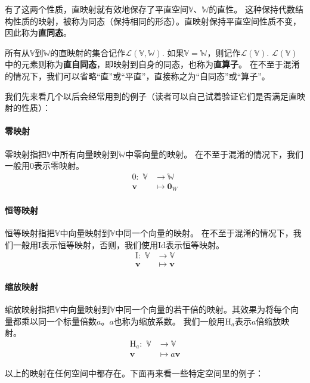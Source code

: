 \documentclass[12pt,UTF8]{ctexbook}
\begin{document}
有了这两个性质，直映射就有效地保存了平直空间$\mathbb{V}$、$\mathbb{W}$的直性。
这种保持代数结构性质的映射，被称为同态（保持相同的形态）。直映射保持平直空间性质不变，因此称为\textbf{直同态}。

所有从$\mathbb{V}$到$\mathbb{W}$的直映射的集合记作$\mathcal{L}(\mathbb{V},\mathbb{W})$.
如果$\mathbb{V} = \mathbb{W}$，则记作$\mathcal{L}(\mathbb{V})$.  
$\mathcal{L}(\mathbb{V})$中的元素则称为\textbf{直自同态}，即映射到自身的同态，也称为\textbf{直算子}。
在不至于混淆的情况下，我们可以省略“直”或“平直”，直接称之为“自同态”或“算子”。

我们先来看几个以后会经常用到的例子（读者可以自己试着验证它们是否满足直映射的性质）：

\paragraph{零映射} 零映射指把$\mathbb{V}$中所有向量映射到$\mathbb{W}$中零向量的映射。
在不至于混淆的情况下，我们一般用$\mathrm{0}$表示零映射。
\begin{align*}
    \mathrm{0}: \,\, \mathbb{V} & \to \mathbb{W}  \\
    \mathbf{v} & \mapsto \mathbf{0}_W 
\end{align*}

\paragraph{恒等映射} 恒等映射指把$\mathbb{V}$中向量映射到$\mathbb{V}$中同一个向量的映射。
在不至于混淆的情况下，我们一般用$\mathrm{I}$表示恒等映射，否则，我们使用$\mathrm{Id}$表示恒等映射。
\begin{align*}
    \mathrm{I}: \,\, \mathbb{V} & \to \mathbb{V}  \\
    \mathbf{v} & \mapsto \mathbf{v} 
\end{align*}

\paragraph{缩放映射}
缩放映射指把$\mathbb{V}$中向量映射到$\mathbb{V}$中同一个向量的若干倍的映射。其效果为将每个向量都乘以同一个标量倍数$a$。$a$也称为缩放系数。
我们一般用$\mathrm{H}_a$表示$a$倍缩放映射。
\begin{align*}
    \mathrm{H}_a: \,\, \mathbb{V} & \to \mathbb{V}  \\
    \mathbf{v} & \mapsto a\mathbf{v} 
\end{align*}

以上的映射在任何空间中都存在。下面再来看一些特定空间里的例子：
\end{document}
